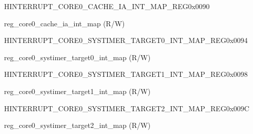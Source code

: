 \begin{register}{H}{INTERRUPT\_CORE0\_CACHE\_IA\_INT\_MAP\_REG}{0x0090}\label{regdesc:INTERRUPTCORE0CACHEIAINTMAPREG}
%
%
\regnewline%
\begin{regdesc}\begin{reglist}
\label{fielddesc:INTERRUPTCORE0CACHEIAINTMAP}\item [INTERRUPT\_CORE0\_CACHE\_IA\_INT\_MAP] reg\_core0\_cache\_ia\_int\_map (R/W)
\end{reglist}\end{regdesc}
\end{register}


\begin{register}{H}{INTERRUPT\_CORE0\_SYSTIMER\_TARGET0\_INT\_MAP\_REG}{0x0094}\label{regdesc:INTERRUPTCORE0SYSTIMERTARGET0INTMAPREG}
%
%
\regnewline%
\begin{regdesc}\begin{reglist}
\label{fielddesc:INTERRUPTCORE0SYSTIMERTARGET0INTMAP}\item [INTERRUPT\_CORE0\_SYSTIMER\_TARGET0\_INT\_MAP] reg\_core0\_systimer\_target0\_int\_map (R/W)
\end{reglist}\end{regdesc}
\end{register}


\begin{register}{H}{INTERRUPT\_CORE0\_SYSTIMER\_TARGET1\_INT\_MAP\_REG}{0x0098}\label{regdesc:INTERRUPTCORE0SYSTIMERTARGET1INTMAPREG}
%
%
\regnewline%
\begin{regdesc}\begin{reglist}
\label{fielddesc:INTERRUPTCORE0SYSTIMERTARGET1INTMAP}\item [INTERRUPT\_CORE0\_SYSTIMER\_TARGET1\_INT\_MAP] reg\_core0\_systimer\_target1\_int\_map (R/W)
\end{reglist}\end{regdesc}
\end{register}


\begin{register}{H}{INTERRUPT\_CORE0\_SYSTIMER\_TARGET2\_INT\_MAP\_REG}{0x009C}\label{regdesc:INTERRUPTCORE0SYSTIMERTARGET2INTMAPREG}
%
%
\regnewline%
\begin{regdesc}\begin{reglist}
\label{fielddesc:INTERRUPTCORE0SYSTIMERTARGET2INTMAP}\item [INTERRUPT\_CORE0\_SYSTIMER\_TARGET2\_INT\_MAP] reg\_core0\_systimer\_target2\_int\_map (R/W)
\end{reglist}\end{regdesc}
\end{register}


